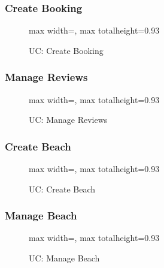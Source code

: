 \documentclass[a4paper,11pt]{article}
\begin{document}
\subsubsection{Create Booking}
\begin{figure}[H]
    \centering
    \begin{adjustbox}{max width=\textwidth, max totalheight=0.93\textheight}
    	
    \end{adjustbox}
    \caption{UC: Create Booking}
    \label{fig:UC05}
\end{figure}

\subsubsection{Manage Reviews}
\begin{figure}[H]
    \centering
    \begin{adjustbox}{max width=\textwidth, max totalheight=0.93\textheight}
    	
    \end{adjustbox}
    \caption{UC: Manage Reviews}
    \label{fig:UC07}
\end{figure}

\subsubsection{Create Beach}
\begin{figure}[H]
    \centering
    \begin{adjustbox}{max width=\textwidth, max totalheight=0.93\textheight}
    	
    \end{adjustbox}
    \caption{UC: Create Beach}
    \label{fig:UC10}
\end{figure}

\subsubsection{Manage Beach}
\begin{figure}[H]
    \centering
    \begin{adjustbox}{max width=\textwidth, max totalheight=0.93\textheight}
    	
    \end{adjustbox}
    \caption{UC: Manage Beach}
    \label{fig:UC11}
\end{figure}
\end{document}
